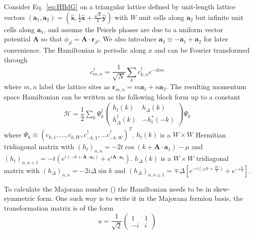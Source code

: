 \documentclass[aps,prb,showpacs,amsmath,twocolumn,amssymb,superscriptaddress]{revtex4-2}
\let\oldhat\hat
\renewcommand{\hat}[1]{\oldhat{\mathbf{#1}}}
\newcommand{\ham}{\mathcal{H}}
\newcommand{\cc}{c^{\dagger}}
\newcommand{\de}{\Delta}
\begin{document}
Consider Eq.~\eqref{eq:HBdG} on a triangular lattice defined by unit-length lattice vectors $(\bm a_1, \bm a_2) = (\hat{x}, \frac{1}{2}\hat{x} + \frac{\sqrt{3}}{2}\hat{y})$ with $W$ unit cells along $\bm a_2$ but infinite unit cells along $\bm a_1$, and assume the Peierls phases are due to a uniform vector potential $\bm A$ so that $\phi_{jl} = \bm A\cdot \bm r_{jl}$. We also introduce $\bm a_3 \equiv -\bm a_1 + \bm a_2$ for later convenience. The Hamiltonian is periodic along $x$ and can be Fourier transformed through
\begin{equation}
  \cc_{m,n} = \dfrac{1}{\sqrt{N}} \sum_{k} \cc_{k,n} e^{-i km}
\end{equation}
where $m,n$ label the lattice sites as $\bm r_{m,n} = m\bm a_1 + n \bm a_2$. The resulting momentum space Hamiltonian can be written as the following block form up to a constant
\begin{eqnarray}
      \ham = \dfrac{1}{2} \sum_k \Psi_k^\dagger \left(
    \begin{matrix}
      h_t(k) & h_\Delta(k) \\
      h_\Delta^\dagger(k) & -h_t^*(-k)
    \end{matrix} \right)
    \Psi_k
\end{eqnarray}
where $\Psi_k \equiv (c_{k,1},\dots, c_{k,W},c^\dag_{-k,1},\dots c_{-k,W}^\dag)^T$. $h_t(k)$ is a $W\times W$ Hermitian tridiagonal matrix with $(h_t)_{n,n} = -2t\cos(k+\bm A\cdot \bm a_1) - \mu$ and $(h_t)_{n,n+1} = -t\left( e^{i(-k+\bm A\cdot \bm a_3)}  + e^{i\bm A \cdot \bm a_2}\right)$. $h_\Delta(k)$ is a $W\times W$ tridiagonal matrix with $(h_\Delta)_{n,n} = -2i\de \sin k $ and $(h_\Delta)_{n,n\pm 1} = \mp \de\left[ e^{-i(\pm k + \frac{2\pi}{3})} + e^{-i\frac{\pi}{3}} \right]$.


















To calculate the Majorana number () the Hamiltonian needs to be in skew-symmetric form.
One such way is to write it in the Majorana fermion basis, the transformation matrix is of the form
\begin{equation}
  u = \dfrac{1}{\sqrt{2}} \left(
  \begin{matrix}
    1 & 1 \\
    -i & i
  \end{matrix} \right)
\end{equation}
\end{document}

